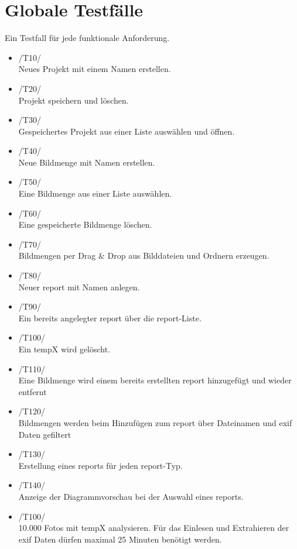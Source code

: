 \section{Globale Testfälle}

Ein Testfall für jede funktionale Anforderung.

\begin{itemize}
	\item /T10/\\ Neues Projekt mit einem Namen erstellen.
	\item /T20/\\ Projekt speichern und löschen.
	\item /T30/\\ Gespeichertes Projekt aus einer Liste auswählen und öffnen.
	\item /T40/\\ Neue Bildmenge mit Namen erstellen.
	\item /T50/\\ Eine Bildmenge aus einer Liste auswählen.
	\item /T60/\\ Eine gespeicherte Bildmenge löschen.
	\item /T70/\\ Bildmengen per Drag & Drop aus Bilddateien und Ordnern erzeugen.
	\item /T80/\\ Neuer \gls{report} mit Namen anlegen.
	\item /T90/\\ Ein bereits angelegter \gls{report} über die \gls{report}-Liste.
	\item /T100/\\ Ein \gls{tempX} wird gelöscht.
	\item /T110/\\ Eine Bildmenge wird einem bereits erstellten \gls{report} hinzugefügt und wieder entfernt
	\item /T120/\\ Bildmengen werden beim Hinzufügen zum \gls{report} über Dateinamen und \gls{exif} Daten gefiltert
	\item /T130/\\ Erstellung eines \gls{report}s für jeden \gls{report}-Typ.
	\item /T140/\\ Anzeige der Diagrammvorschau bei der Auswahl eines \gls{report}s. 
	\item /T100/\\ 10.000 Fotos mit \gls{tempX} analysieren. Für das Einlesen und Extrahieren der \gls{exif} Daten dürfen maximal 25 Minuten benötigt werden.
\end{itemize}